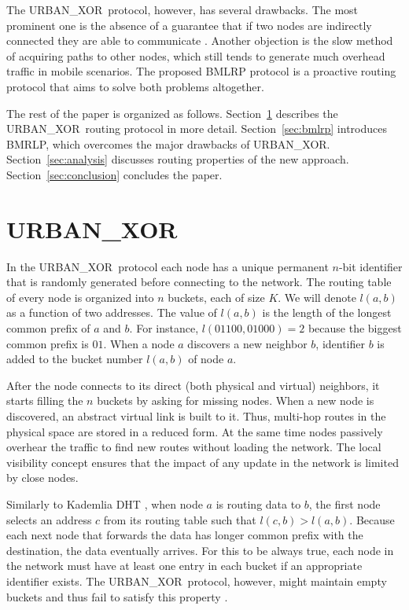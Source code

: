 \documentclass[conference]{IEEEtran}
\theoremstyle{definition}
\newcommand{\urbanxor}{URBAN\_XOR}
\begin{document}
The \urbanxor\ protocol, however, has several drawbacks. The most prominent one is the absence of a guarantee that if two nodes are indirectly connected they are able to communicate \cite{Pasquini}. Another objection is the slow method of acquiring paths to other nodes, which still tends to generate much overhead traffic in mobile scenarios. The proposed BMLRP protocol is a proactive routing protocol that aims to solve both problems altogether.

The rest of the paper is organized as follows. Section~\ref{sec:urbanxor} describes the \urbanxor\ routing protocol in more detail. Section~\ref{sec:bmlrp} introduces BMRLP, which overcomes the major drawbacks of \urbanxor. 
Section~\ref{sec:analysis} discusses routing properties of the new approach. 
Section~\ref{sec:conclusion} concludes the paper.


\section{\urbanxor}
\label{sec:urbanxor}

In the \urbanxor\ protocol each node has a unique permanent $n$-bit identifier that is randomly generated before connecting to the network. The routing table of every node is organized into $n$ buckets, each of size $K$. We will denote $l(a,b)$ as a function of two addresses. The value of $l(a,b)$ is the length of the longest common prefix of $a$ and $b$. For instance, $l(01100, 01000) = 2$ because the biggest common prefix is $01$. When a node $a$ discovers a new neighbor $b$, identifier $b$ is added to the bucket number $l(a,b)$ of node $a$.

After the node connects to its direct (both physical and virtual) neighbors, it starts filling the $n$ buckets by asking for missing nodes. When a new node is discovered, an abstract virtual link is built to it. Thus, multi-hop routes in the physical space are stored in a reduced form. At the same time nodes passively overhear the traffic to find new routes without loading the network. The local visibility concept ensures that the impact of any update in the network is limited by close nodes.

Similarly to Kademlia DHT \cite{kademlia}, when node $a$ is routing data to $b$, the first node selects an address $c$ from its routing table such that $l(c,b) > l(a,b)$. Because each next node that forwards the data has longer common prefix with the destination, the data eventually arrives. For this to be always true, each node in the network must have at least one entry in each bucket if an appropriate identifier exists. The \urbanxor\ protocol, however, might maintain empty buckets and thus fail to satisfy this property \cite{Pasquini}.
\end{document}
